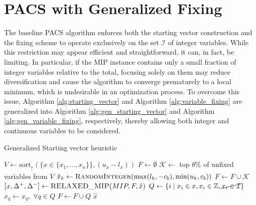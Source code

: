 \section{PACS with Generalized Fixing}\label{sec:gen_fixing}
The baseline PACS algorithm enforces both the starting vector construction and the fixing scheme to operate exclusively on the set $\mathcal{I}$ of integer variables. While this restriction may appear efficient and straightforward, it can, in fact, be limiting. In particular, if the MIP instance contains only a small fraction of integer variables relative to the total, focusing solely on them may reduce diversification and cause the algorithm to converge prematurely to a local minimum, which is undesirable in an optimization process.
To overcome this issue, Algorithm \ref{alg:starting_vector} and Algorithm \ref{alg:variable_fixing} are generalized into Algorithm \ref{alg:gen_starting_vector} and Algorithm \ref{alg:gen_variable_fixing}, respectively, thereby allowing both integer and continuous variables to be considered.
\begin{algorithm}[H]
\caption{Generalized Starting vector heuristic}\label{alg:gen_starting_vector}
\begin{algorithmic}[1]
\Require{Original $MIP$ formulation; Percentage of variables to fix $\theta \in (0,100]$; Fixed bound constant $c_b$}
\State $V \gets \text{sort}_\uparrow(\big \{x \in \{x_1,\dots,x_n\}\big\}, (u_x-l_x))$
\State $F \gets \emptyset$
    \State $\mathcal{K} \gets$ top $\theta \%$ of unfixed variables from $V$
        \State $\hat{x}_k \gets \Call{RandomInteger}{\max(l_k, -c_b), \min(u_k, c_b)}$
    \EndFor
    \State $F \gets F \cup \mathcal{K}$
    \State $[x, \Delta^+, \Delta^-] \gets \Call{RELAXED\_MIP}{MIP, F, \hat{x}}$
    \State $Q \gets \{i \;|\; x_i \in x, x_i \in \mathbb{Z},\cancel{x_i \in \mathcal{I}}\}$
    \State $\hat{x}_q \gets x_q, \; \forall q \in Q$
    \State $F \gets F \cup Q$
\EndWhile
\State \Return $\hat{x}$
\EndFunction
\end{algorithmic}
\end{algorithm}


